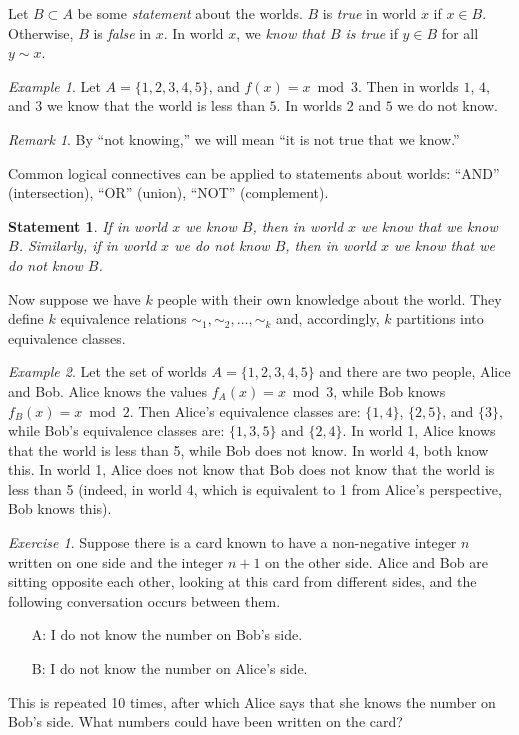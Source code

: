 \documentclass[12pt,sans]{article}
\theoremstyle{definition}
\theoremstyle{plain}
\newtheorem{statement}{Statement}[section]
\theoremstyle{remark}
\newtheorem{example}{Example}[section]
\newtheorem{exercise}{Exercise}[section]
\newtheorem{remark}{Remark}[section]
\begin{document}
Let \(B \subset A\) be some \emph{statement} about the worlds. \(B\) is \emph{true} in world \(x\) if \(x \in B\).
Otherwise, \(B\) is \emph{false} in \(x\). In world \(x\), we \emph{know that \(B\) is true} if \(y \in B\) for all
\(y \sim x\).

\begin{example}
    Let \(A = \{1,2,3,4,5\}\), and \(f(x) = x \bmod 3\). Then in worlds \(1\), \(4\), and \(3\) we know that the world is less than \(5\).
    In worlds \(2\) and \(5\) we do not know.
\end{example}
\begin{remark}
    By ``not knowing,'' we will mean ``it is not true that we know.''
\end{remark}

Common logical connectives can be applied to statements about worlds: ``AND'' (intersection), ``OR'' (union),
``NOT'' (complement).

\begin{statement}
    If in world \(x\) we know \(B\), then in world \(x\) we know that we know \(B\).
    Similarly, if in world \(x\) we do not know \(B\), then in world \(x\) we know that we do not know \(B\).
\end{statement}

Now suppose we have \(k\) people with their own knowledge about the world.
They define \(k\) equivalence relations \(\sim_1, \sim_2, \dotsc, \sim_k\) and,
accordingly, \(k\) partitions into equivalence classes.

\begin{example}
    Let the set of worlds \(A = \{1,2,3,4,5\}\) and there are two people, Alice and Bob.
    Alice knows the values \(f_A(x) = x \bmod 3\), while Bob knows \(f_B(x) = x \bmod 2\).
    Then Alice's equivalence classes are: \(\{1,4\}\), \(\{2,5\}\), and \(\{3\}\),
    while Bob's equivalence classes are: \(\{1,3,5\}\) and \(\{2,4\}\).
    In world 1, Alice knows that the world is less than 5, while Bob does not know. In world 4, both know this.
    In world 1, Alice does not know that Bob does not know that the world is less than 5 (indeed, in world 4,
    which is equivalent to 1 from Alice's perspective, Bob knows this).
\end{example}

\begin{exercise}
    Suppose there is a card known to have a non-negative integer \(n\) written on one side and the integer \(n+1\) on the other side.
    Alice and Bob are sitting opposite each other, looking at this card from different sides, and the following conversation occurs between them.
    \begin{itemize}
        \item[A:] I do not know the number on Bob's side.
        \item[B:] I do not know the number on Alice's side.
    \end{itemize}
    This is repeated 10 times, after which Alice says that she knows the number on Bob's side. What numbers could have been written on the card?
\end{exercise}
\end{document}
